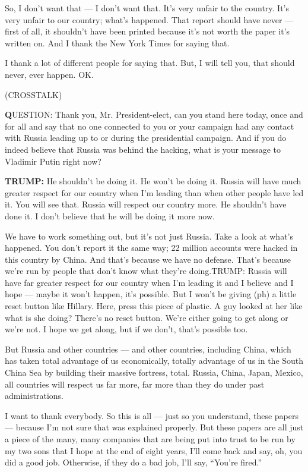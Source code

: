 So, I don't want that --- I don't want that. It's very unfair to the
country. It's very unfair to our country; what's happened. That report
should have never --- first of all, it shouldn't have been printed
because it's not worth the paper it's written on. And I thank the New
York Times for saying that.

I thank a lot of different people for saying that. But, I will tell you,
that should never, ever happen. OK.

(CROSSTALK)

\textbf{Q}UESTION: Thank you, Mr. President-elect, can you stand here
today, once and for all and say that no one connected to you or your
campaign had any contact with Russia leading up to or during the
presidential campaign. And if you do indeed believe that Russia was
behind the hacking, what is your message to Vladimir Putin right now?

\textbf{TRUMP:} He shouldn't be doing it. He won't be doing it. Russia
will have much greater respect for our country when I'm leading than
when other people have led it. You will see that. Russia will respect
our country more. He shouldn't have done it. I don't believe that he
will be doing it more now.

We have to work something out, but it's not just Russia. Take a look at
what's happened. You don't report it the same way; 22 million accounts
were hacked in this country by China. And that's because we have no
defense. That's because we're run by people that don't know what they're
doing.TRUMP: Russia will have far greater respect for our country when
I'm leading it and I believe and I hope --- maybe it won't happen, it's
possible. But I won't be giving (ph) a little reset button like Hillary.
Here, press this piece of plastic. A guy looked at her like what is she
doing? There's no reset button. We're either going to get along or we're
not. I hope we get along, but if we don't, that's possible too.

But Russia and other countries --- and other countries, including China,
which has taken total advantage of us economically, totally advantage of
us in the South China Sea by building their massive fortress, total.
Russia, China, Japan, Mexico, all countries will respect us far more,
far more than they do under past administrations.

I want to thank everybody. So this is all --- just so you understand,
these papers --- because I'm not sure that was explained properly. But
these papers are all just a piece of the many, many companies that are
being put into trust to be run by my two sons that I hope at the end of
eight years, I'll come back and say, oh, you did a good job. Otherwise,
if they do a bad job, I'll say, ``You're fired.''

